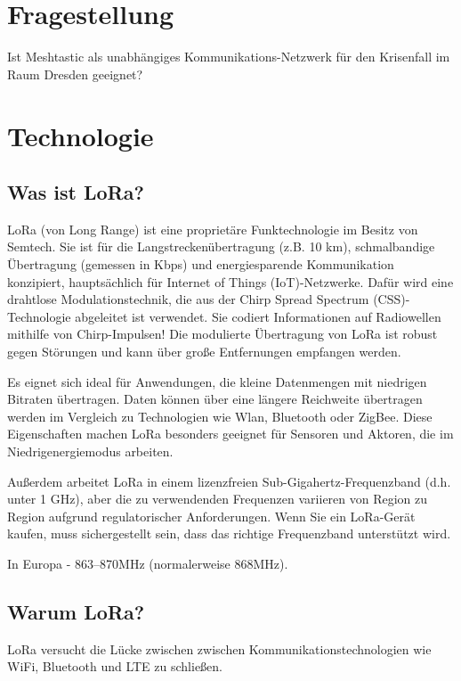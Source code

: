 \documentclass[12pt,a4paper]{article}
\begin{document}
\section{Fragestellung}

Ist Meshtastic als unabhängiges Kommunikations-Netzwerk für den Krisenfall im Raum Dresden geeignet?

\section{Technologie}
\subsection{Was ist LoRa?}

LoRa (von Long Range) ist eine proprietäre Funktechnologie im Besitz von Semtech. Sie ist für die Langstreckenübertragung (z.B. 10 km), schmalbandige Übertragung (gemessen in Kbps) und energiesparende Kommunikation konzipiert, hauptsächlich für Internet of Things (IoT)-Netzwerke. Dafür wird eine drahtlose Modulationstechnik, die aus der Chirp Spread Spectrum (CSS)-Technologie abgeleitet ist verwendet. Sie codiert Informationen auf Radiowellen mithilfe von Chirp-Impulsen! Die modulierte Übertragung von LoRa ist robust gegen Störungen und kann über große Entfernungen empfangen werden.

Es eignet sich ideal für Anwendungen, die kleine Datenmengen mit niedrigen Bitraten übertragen. Daten können über eine längere Reichweite übertragen werden im Vergleich zu Technologien wie Wlan, Bluetooth oder ZigBee. Diese Eigenschaften machen LoRa besonders geeignet für Sensoren und Aktoren, die im Niedrigenergiemodus arbeiten.

Außerdem arbeitet LoRa in einem lizenzfreien Sub-Gigahertz-Frequenzband (d.h. unter 1 GHz), aber die zu verwendenden Frequenzen variieren von Region zu Region aufgrund regulatorischer Anforderungen. Wenn Sie ein LoRa-Gerät kaufen, muss sichergestellt sein, dass das richtige Frequenzband unterstützt wird.

In Europa - 863–870MHz (normalerweise 868MHz).
\newpage
\subsection{Warum LoRa?}

LoRa versucht die Lücke zwischen zwischen Kommunikationstechnologien wie WiFi, Bluetooth und LTE zu schließen.\\
\end{document}
